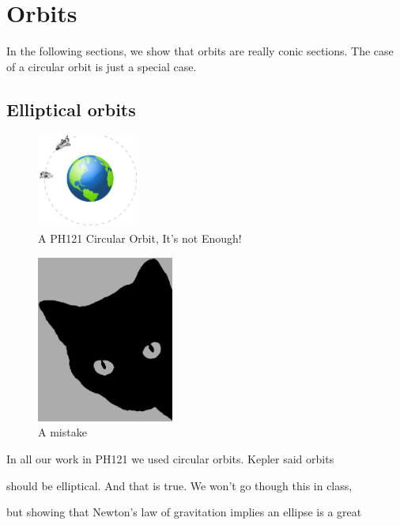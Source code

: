 \chapter{Orbits}
In the following sections, we show that orbits are really conic sections. The case of a circular orbit is just a special case.
\section{Elliptical orbits}


\begin{figure}[h]
	\begin{center}
	\includegraphics[width=0.3\textwidth]{orbit_figure}	
	\caption{A PH121 Circular Orbit, It's not Enough!}
\end{center}
\end{figure}


\begin{figure}[h!]
	\begin{center}
		\includegraphics[width=0.4\textwidth]{cat}	
		\caption{A mistake}
	\end{center}
\end{figure}

In all our work in PH121 we used circular orbits. Kepler said orbits

should be elliptical. And that is true. We won't go though this in class,

but showing that Newton's law of gravitation implies an ellipse is a great

